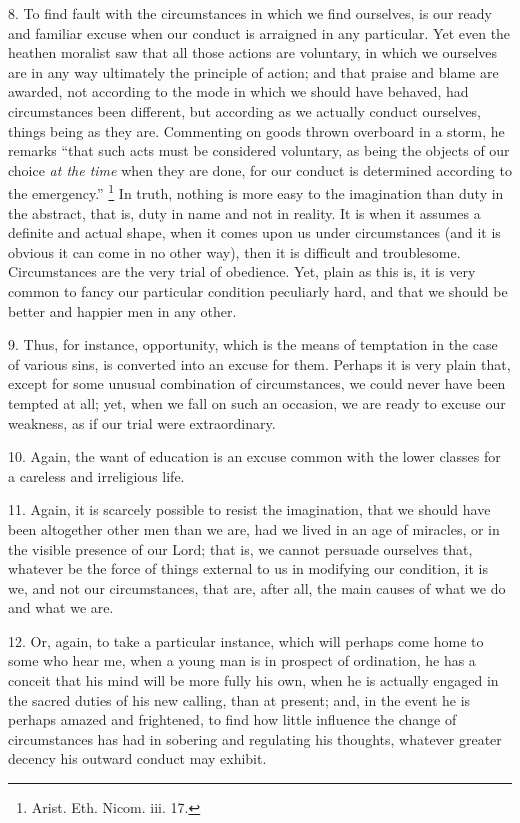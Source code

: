 8. To find fault with the circumstances in which we find ourselves,
is our ready and familiar excuse when our conduct is arraigned in any
particular. Yet even the heathen moralist saw that all those actions
are voluntary, in which we ourselves are in any way ultimately the
principle of action; and that praise and blame are awarded, not
according to the mode in which we should have behaved, had
circumstances been different, but according as we actually conduct
ourselves, things being as they are. Commenting on goods thrown
overboard in a storm, he remarks ``that such acts must be
considered voluntary, as being the objects of our choice \emph{at the
time} when they are done, for our conduct is determined according
to the emergency.'' \footnote{Arist. Eth. Nicom. iii. 17.}
In truth, nothing is more easy to the imagination than duty in the
abstract, that is, duty in name and not in reality. It is when it
assumes a definite and actual shape, when it comes upon us under
circumstances (and it is obvious it can come in no other way), then it
is difficult and troublesome. Circumstances are the very trial of
obedience. Yet, plain as this is, it is very common to fancy our
particular condition peculiarly hard, and that we should be better and
happier men in any other.

9. Thus, for instance, opportunity, which is the means of
temptation in the case of various sins, is converted into an excuse
for them. Perhaps it is very plain that, except for some unusual
combination of circumstances, we could never have been tempted at all;
yet, when we fall on such an occasion, we are ready to excuse our
weakness, as if our trial were extraordinary.

10. Again, the want of education is an excuse common with the lower
classes for a careless and irreligious life.

11. Again, it is scarcely possible to resist the imagination, that
we should have been altogether other men than we are, had we lived in
an age of miracles, or in the visible presence of our Lord; that is,
we cannot persuade ourselves that, whatever be the force of things
external to us in modifying our condition, it is we, and not our
circumstances, that are, after all, the main causes of what we do and
what we are.

12. Or, again, to take a particular instance, which will perhaps
come home to some who hear me, when a young man is in prospect of
ordination, he has a conceit that his mind will be more fully his own,
when he is actually engaged in the sacred duties of his new calling,
than at present; and, in the event he is perhaps amazed and
frightened, to find how little influence the change of circumstances
has had in sobering and regulating his thoughts, whatever greater
decency his outward conduct may exhibit.

